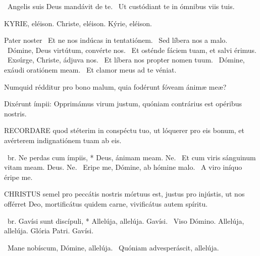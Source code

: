 \V\ Angelis suis Deus mandávit de te. \R\ Ut custódiant te in ómnibus viis tuis.


KYRIE, eléison. Christe, eléison. Kýrie, eléison.

Pater noster  \V\ Et ne nos indúcas in tentatiónem. \R\ Sed líbera nos a malo. \V\ Dómine, Deus virtútum, convérte nos. \R\ Et osténde fáciem tuam, et salvi érimus. \V\ Exsúrge, Christe, ádjuva nos. \R\ Et líbera nos propter nomen tuum. \V\ Dómine, exáudi oratiónem meam. \R\ Et clamor meus ad te véniat.




 Numquid rédditur pro bono malum, quia fodérunt fóveam ánimæ meæ?


 Dixérunt ímpii: Opprimámus virum justum, quóniam contrárius est opéribus nostris.


\lettrine[lines=2]{R}{ECORDARE} quod stéterim in conspéctu tuo, ut lóquerer pro eis bonum, et avérterem indignatiónem tuam ab eis.

\R\ br. Ne perdas cum ímpiis, * Deus, ánimam meam. Ne. \V\ Et cum viris sánguinum vitam meam. Deus. Ne. \V\ Eripe me, Dómine, ab hómine malo. \R\ A viro iníquo éripe me.




\lettrine[lines=2]{C}{HRISTUS} semel pro peccátis nostris mórtuus est, justus pro injústis, ut nos offérret Deo, mortificátus quidem carne, vivificátus autem spíritu.

\R\ br. Gavísi sunt discípuli, * Allelúja, allelúja. Gavísi. \V\ Viso Dómino. Allelúja, allelúja. Glória Patri. Gavísi.

\V\ Mane nobíscum, Dómine, allelúja. \R\ Quóniam advesperáscit, allelúja.


\sectionornament


